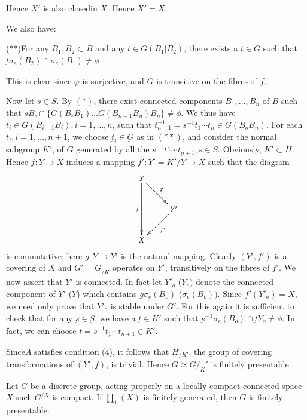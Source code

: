 Hence $X'$ is also closed\pageoriginale in $X$. Hence $X' = X$.

We also have:

\noindent
(**)\quad For any $B_1,B_2 \subset B$ and any $t \in G(B_1|B_2)$, there
exists a $\underbar{t} \in \underbar{G}$ such that $\underbar{t}
\sigma_e (B_2) \cap \sigma_{\underbar{e}} (B_1) \neq \phi$ 

This is clear since $\varphi$ is surjective, and $\underbar{G}$ is
transitive on the fibres of $f$.  

Now let $s \in S$. By $(*)$, there exist connected components $B_1,
\ldots , B_n$ of $B$ such that $s B_\circ \cap \{ G(B_\circ B_1) \ldots
G(B_{n-1} B_n) B_n \} \neq \phi$. We thus have $t_i \in G(B_{i-1}
B_i),i = 1, \ldots , n$, such that $t^{-1}_{n+1} = s^{-1} t_1 \cdots
t_n \in G(B_o B_n)$. For each $t_i , i = 1, \ldots , n+1$, we choose
$\underbar{t}_i \in \underbar{G}$ as in $(**)$, and consider the
normal subgroup $K'$, of $\underbar{G}$ generated by all the
$\underbar{s}^{-1}\underbar{t1} \cdots t_{\underbar{n} +1}, s \in
S$. Obviously, $K' \subset H$. Hence $f: Y \to X$ induces a mapping
$f': Y' =K'/Y \to X$ such that the diagram  
\[
\xymatrix{Y \ar[dd]_f \ar[rd]^g &\\ 
& Y' \ar[ld]^{f'}\\
X & 
}
\]
is commutative; here $g:Y \to Y'$ is the natural mapping. Clearly
$(Y',f')$ is a covering of $X$ and $\underbar{G}' = \underbar{G}_{/K}$
operates on $Y'$, transitively on the fibres of $f'$. We now assert
that $Y'$ is connected. In fact let $Y'_o$ (\resp $Y_o)$ denote the
connected component of $Y'$ (\resp $Y$) which 
contains $g \sigma_{\underbar{e}}(B_o)$ (\resp $\sigma_e(B_o))$. Since
$f'(Y'_o) = X$, we need only prove that $Y'_o$ is stable under
$\underbar{G}'$. For this again it is sufficient to check that for any
$\underbar{s} \in \underbar{S}$, we have a $\underbar{t} \in K'$ such
that $\underbar{s}^{-1} \sigma_{\underbar{e}} (B_o) \cap \underbar{t} Y_o \neq
\phi$. In fact, we can choose $\underbar{t} = \underbar{s}^{-1}
t_{\underbar{1}} \cdots t_{n+1} \in K'$. 

Since\pageoriginale $A$ satisfies condition (4), it follows that $H_{/ K'}$, the
group of covering transformations of $(Y',f)$, is trivial. Hence $G
\approx \underbar{G}/_{K}'$ is finitely presentable . 

\begin{rem}%
  Let $G$ be a discrete group, acting properly on a locally compact
  connected space $X$ such $G^{/X}$ is compact. If $\prod_1 (X)$ is
  finitely generated, then $G$ is finitely presentable. 
\end{rem}

